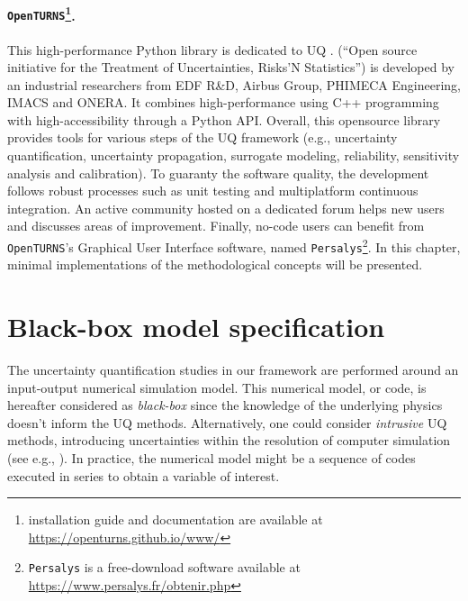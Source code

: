 \paragraph*{\textbf{\texttt{OpenTURNS}}\footnote{\ot installation guide and documentation are available at \url{https://openturns.github.io/www/}}.} 
This high-performance Python library is dedicated to UQ \citep{baudin_dutfoy_2017}. 
\ot (``Open source initiative for the Treatment of Uncertainties, Risks’N Statistics'') is developed by an industrial researchers from  EDF R\&D, Airbus Group, PHIMECA Engineering, IMACS and ONERA.
It combines high-performance using C++ programming with high-accessibility through a Python API. 
Overall, this opensource library provides tools for various steps of the UQ framework 
(e.g., uncertainty quantification, uncertainty propagation, surrogate modeling, reliability, sensitivity analysis and calibration). 
To guaranty the software quality, the development follows robust processes such as unit testing and multiplatform continuous integration. 
An active community hosted on a dedicated forum helps new users and discusses areas of improvement.
Finally, no-code users can benefit from \texttt{OpenTURNS}'s Graphical User Interface software, named \texttt{Persalys}\footnote{\texttt{Persalys} is a free-download software available at \url{https://www.persalys.fr/obtenir.php}}.
In this chapter, minimal \ot implementations of the methodological concepts will be presented. 



\section{Black-box model specification}
The uncertainty quantification studies in our framework are performed around an input-output numerical simulation model. 
This numerical model, or code, is hereafter considered as \textit{black-box} since the knowledge of the underlying physics doesn't inform the UQ methods. 
Alternatively, one could consider \textit{intrusive} UQ methods, introducing uncertainties within the resolution of computer simulation (see e.g., \citet{lemaitre_2010}).
In practice, the numerical model might be a sequence of codes executed in series to obtain a variable of interest.


